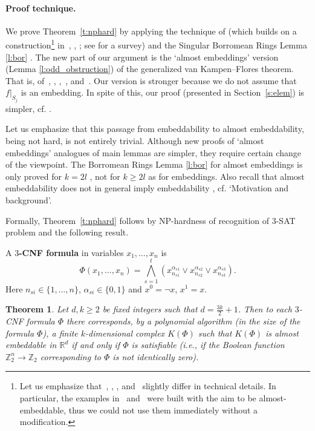 \documentclass[runningheads]{llncs}
\newtheorem{theorem}{Theorem}
\theoremstyle{remark}
\theoremstyle{definition}
\newcommand{\R}{\mathbb{R}}
\newcommand{\Z}{\mathbb{Z}}
\begin{document}
\paragraph{Proof technique.}
We prove Theorem~\ref{t:nphard} by applying the technique of \cite{MaTaWa11}
(which builds on a construction\footnote{Let us emphasize that~\cite{SeSp92},
\cite{FKT}, \cite{SSS}, and~\cite{MaTaWa11} slightly differ in technical
details. In particular, the examples in~\cite{SeSp92} and~\cite{SSS} were built with the aim to
be almost-embeddable, thus we could not use them immediately without a
modification.} in~\cite{SeSp92}, \cite{FKT}, \cite{SSS}; see \cite[\S5, \S7]{Sk08} for a survey) and
the Singular Borromean Rings Lemma \ref{l:bor} \cite{AMSW}.
The new part of our argument is the `almost embeddings' version (Lemma \ref{l:odd_obstruction}) of the generalized van Kampen--Flores theorem.
That is, of~\cite[Lemma 1.4]{SeSp92}, \cite[Lemma 6]{FKT},
\cite[Lemma 1.1]{SSS},~\cite[Lemma 7.2]{Sk08}, and~\cite[Lemmas~4.1 and ~5.1(i)]{MaTaWa11}.
Our version is stronger because we do not assume that $f|_{S_j}$ is an embedding.
In spite of this, our proof (presented in Section~\ref{s:elem}) is simpler, cf.  \cite[Remark at the end of 5.1]{MaTaWa11}.

Let us emphasize that this passage from embeddability to almost embeddability, being not hard, is not entirely trivial.
Although new proofs of `almost embeddings' analogues of main lemmas are simpler, they require certain change of the viewpoint.
The Borromean Rings Lemma \ref{l:bor} for almost embeddings is only proved for $k=2l$ \cite{AMSW},
not for $k\ge 2l$ as for embeddings.
Also recall that almost embeddability does not in general imply embeddability \cite{SeSp92, SSS}, cf. `Motivation and background'. 

\medskip
Formally, Theorem~\ref{t:nphard} follows by NP-hardness of recognition of 3-SAT problem and the following result.

A {\bf $3$-CNF formula} in variables $x_1, \dots, x_n$ is
$$\Phi(x_1,\ldots,x_n)=\bigwedge\limits_{s=1}^t
(x_{n_{s1}}^{\alpha_{s1}}\vee x_{n_{s2}}^{\alpha_{s2}}\vee x_{n_{s3}}^{\alpha_{s3}}).$$
Here $n_{si}\in\{1,\ldots,n\}$, $\alpha_{si}\in\{0,1\}$ and $x^0=\neg x$, $x^1=x$.

\begin{theorem}\label{t:kphi}
Let $d,k\ge2$ be fixed integers such that $d=\frac{3k}2+1$.
Then to each $3$-CNF formula $\Phi$ there corresponds, by a polynomial algorithm (in the size of the formula $\Phi$), a finite $k$-dimensional complex $K(\Phi)$ such that $K(\Phi)$ is almost embeddable in $\R^d$ if and only if $\Phi$ is satisfiable (i.e., if the Boolean function $\Z_2^n\to\Z_2$ corresponding to $\Phi$ is not identically zero).
\end{theorem}
\end{document}
